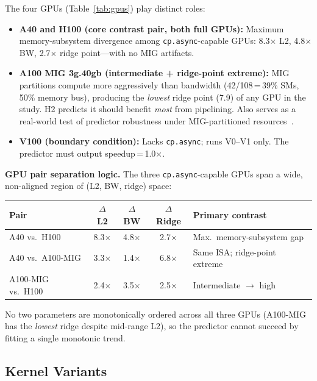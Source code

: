 \documentclass[sigplan,nonacm,10pt]{acmart}
\begin{document}
The four GPUs (Table~\ref{tab:gpus}) play distinct roles:

\begin{itemize}
\item \textbf{A40 and H100 (core contrast pair, both full GPUs):}
  Maximum memory-subsystem divergence among \texttt{cp.async}-capable
  GPUs: 8.3$\times$ L2, 4.8$\times$ BW, 2.7$\times$ ridge point---with
  no MIG artifacts.

\item \textbf{A100 MIG 3g.40gb (intermediate + ridge-point extreme):}
  MIG partitions compute more aggressively than bandwidth
  (42/108\,=\,39\% SMs, 50\% memory bus), producing the \emph{lowest}
  ridge point (7.9) of any GPU in the study.
  H2 predicts it should benefit \emph{most} from pipelining.
  Also serves as a real-world test of predictor robustness under
  MIG-partitioned resources~\cite{mig_guide}.

\item \textbf{V100 (boundary condition):}
  Lacks \texttt{cp.async}; runs V0--V1 only.  The predictor must output
  speedup\,=\,1.0$\times$.
\end{itemize}

\smallskip
\noindent\textbf{GPU pair separation logic.}
The three \texttt{cp.async}-capable GPUs span a wide, non-aligned
region of (L2, BW, ridge) space:

{\small
\begin{center}
\begin{tabular}{@{}lcccl@{}}
\toprule
\textbf{Pair} & $\Delta$\textbf{L2} & $\Delta$\textbf{BW}
  & $\Delta$\textbf{Ridge} & \textbf{Primary contrast} \\
\midrule
A40 vs.\ H100       & 8.3$\times$ & 4.8$\times$ & 2.7$\times$
  & Max.\ memory-subsystem gap \\
A40 vs.\ A100-MIG   & 3.3$\times$ & 1.4$\times$ & 6.8$\times$
  & Same ISA; ridge-point extreme \\
A100-MIG vs.\ H100  & 2.4$\times$ & 3.5$\times$ & 2.5$\times$
  & Intermediate $\to$ high \\
\bottomrule
\end{tabular}
\end{center}
}

\noindent No two parameters are monotonically ordered across all three
GPUs (A100-MIG has the \emph{lowest} ridge despite mid-range L2), so
the predictor cannot succeed by fitting a single monotonic trend.

\subsection{Kernel Variants}
\end{document}
